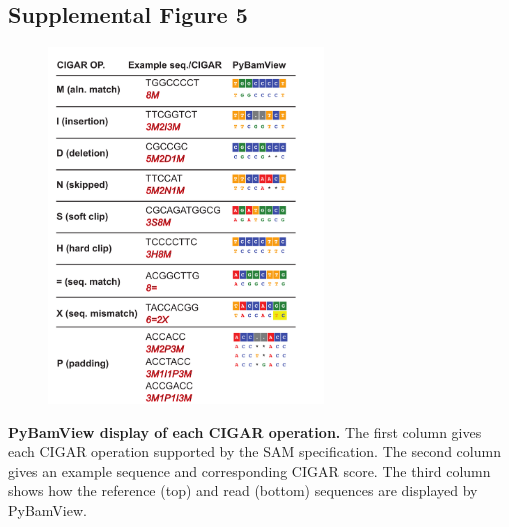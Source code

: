 \subsection{Supplemental Figure 5}
\begin{figure}[h!]
\centering
\label{fig:pbvsup5}
\includegraphics[width=0.65\textwidth]{Figures/App2/SuppFig5.pdf}
\end{figure}
\textbf{PyBamView display of each CIGAR operation.} The first column gives each CIGAR operation supported by the SAM specification. The second column gives an example sequence and corresponding CIGAR score. The third column shows how the reference (top) and read (bottom) sequences are displayed by PyBamView. 



